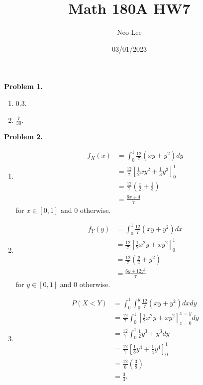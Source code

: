 \documentclass{article}
\title{Math 180A HW7}
\author{Neo Lee}
\date{03/01/2023}
\begin{document}
 

\maketitle 

\textbf{Problem 1.}
\begin{enumerate}[label={(\alph*)}]
    \item 0.3.
    \item $\frac{7}{30}$.
\end{enumerate}
\bigbreak

\textbf{Problem 2.}
\begin{enumerate}[label={(\alph*)}]
    \item 
    \begin{align}
        f_X(x) & = \int_{0}^{1} \frac{12}{7}(xy+y^2)dy \\
        & = \frac{12}{7}\left[\frac{1}{2}xy^2+\frac{1}{3}y^3\right]_0^1 \\
        & = \frac{12}{7}\left(\frac{x}{2}+\frac{1}{3}\right) \\
        & = \frac{6x+4}{7}
    \end{align}
    for $x \in [0,1]$ and 0 otherwise.

    \item 
    \begin{align}
        f_Y(y) & = \int_{0}^{1} \frac{12}{7}(xy+y^2)dx \\
        & = \frac{12}{7}\left[\frac{1}{2}x^2y+xy^2\right]_0^1 \\
        & = \frac{12}{7}\left(\frac{y}{2}+y^2\right) \\
        & = \frac{6y + 12y^2}{7}
    \end{align}
    for $y \in [0,1]$ and 0 otherwise.

    \item 
    \begin{align}
        P(X<Y) & = \int_{0}^{1}\int_{0}^{y} \frac{12}{7}(xy+y^2)dxdy \\
        & = \frac{12}{7}\int_{0}^{1}\left[\frac{1}{2}x^2y+xy^2\right]_{x=0}^{x=y} dy \\
        & = \frac{12}{7}\int_{0}^{1} \frac{1}{2}y^3+y^3dy \\
        & = \frac{12}{7}\left[\frac{1}{8}y^4+\frac{1}{4}y^4\right]_0^1 \\
        & = \frac{12}{6}\left(\frac{3}{8}\right) \\
        & = \frac{3}{4}.
    \end{align}
\end{enumerate}
\bigbreak
\end{document}
